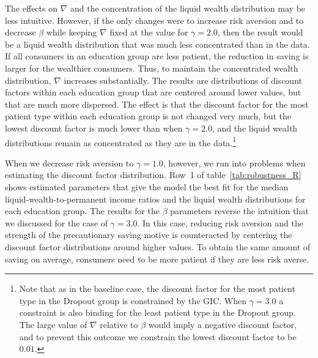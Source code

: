 \documentclass[\econtexRoot/HAFiscal]{subfiles}
\begin{document}
The effects on $\nabla$ and the concentration of the liquid wealth distribution may be less intuitive. However, if the only changes were to increase risk aversion and to decrease $\beta$ while keeping $\nabla$ fixed at the value for $\gamma=2.0$, then the result would be a liquid wealth distribution that was much less concentrated than in the data. If all consumers in an education group are less patient, the reduction in saving is larger for the wealthier consumers. Thus, to maintain the concentrated wealth distribution, $\nabla$ increases substantially. The results are distributions of discount factors within each education group that are centered around lower values, but that are much more dispersed. The effect is that the discount factor for the most patient type within each education group is not changed very much, but the lowest discount factor is much lower than when $\gamma=2.0$, and the liquid wealth distributions remain as concentrated as they are in the data.\footnote{Note that as in the baseline case, the discount factor for the most patient type in the Dropout group is constrained by the GIC. When $\gamma=3.0$ a constraint is also binding for the least patient type in the Dropout group. The large value of $\nabla$ relative to $\beta$ would imply a negative discount factor, and to prevent this outcome we constrain the lowest discount factor to be $0.01$.}

When we decrease risk aversion to $\gamma=1.0$, however, we run into problems when estimating the discount factor distribution. Row~1 of table~\ref{tab:robustness_R} shows estimated parameters that give the model the best fit for the median liquid-wealth-to-permanent income ratios and the liquid wealth distributions for each education group. The results for the $\beta$ parameters reverse the intuition that we discussed for the case of $\gamma=3.0$. In this case, reducing risk aversion and the strength of the precautionary saving motive is counteracted by centering the discount factor distributions around higher values. To obtain the same amount of saving on average, consumers need to be more patient if they are less risk averse.  
\end{document}
